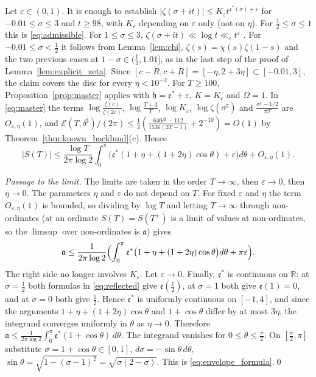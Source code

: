 \documentclass[11pt,a4paper]{article}
\makeatletter
\numberwithin{equation}{section}
\DeclareRobustCommand{\CGref}[1]{\ref{#1}}
\DeclareRobustCommand{\CGeqref}[1]{\eqref{#1}}
\DeclareRobustCommand{\CGcite}[2][]{\if\relax\detokenize{#1}\relax\cite{#2}\else\cite[#1]{#2}\fi}
\let\CG@origref\ref
\let\CG@origeqref\eqref
\newcommand{\CG@gettip}[1]{\@ifundefined{CGTip@#1}{#1}{\csname CGTip@#1\endcsname}}
\newcommand{\CG@getbib}[1]{\@ifundefined{CGBib@#1}{#1}{\csname CGBib@#1\endcsname}}
\DeclareRobustCommand{\CGref}[1]{\pdftooltip{\CG@origref{#1}}{\CG@gettip{#1}}}
\DeclareRobustCommand{\CGeqref}[1]{\pdftooltip{\CG@origeqref{#1}}{\CG@gettip{#1}}}
\DeclareRobustCommand{\CGcite}[2][]{\pdftooltip{\if\relax\detokenize{#1}\relax\cite{#2}\else\cite[#1]{#2}\fi}{\CG@getbib{#2}}}
\theoremstyle{definition}
\theoremstyle{remark}
\newcommand{\R}{\mathbb R}
\makeatother
\begin{document}
Let $\varepsilon\in(0,1)$. It is enough to establish $|\zeta(\sigma+it)|\le K_\varepsilon t^{\mathfrak e^*(\sigma)+\varepsilon}$ for $-0.01\le\sigma\le3$ and $t\ge98$, with $K_\varepsilon$ depending on $\varepsilon$ only (not on $\eta$). For $\frac12\le\sigma\le1$ this is \CGeqref{eq:admissible}. For $1\le\sigma\le3$, $\zeta(\sigma+it)\ll\log t\ll_\varepsilon t^\varepsilon$ \CGcite[Thm.~3.5]{Titchmarsh1986}. For $-0.01\le\sigma<\frac12$ it follows from Lemma~\CGref{lem:chi}, $\zeta(s)=\chi(s)\zeta(1-s)$ and the two previous cases at $1-\sigma\in(\frac12,1.01]$, as in the last step of the proof of Lemma~\CGref{lem:explicit_zeta}. Since $[c-R,c+R]=[-\eta,2+3\eta]\subset[-0.01,3]$, the claim covers the disc for every $\eta<10^{-2}$. For $T\ge100$, Proposition~\CGref{prop:master} applies with $\mathfrak h=\mathfrak e^*+\varepsilon$, $K=K_\varepsilon$ and $\Omega=1$. In \CGeqref{eq:master} the terms $\log\frac{\zeta(c)}{\zeta(2c)}$, $\log\frac{T+3}T$, $\log K_\varepsilon$, $\log\zeta(\sigma^\sharp)$ and $\frac{\sigma^\sharp-1/2}{\pi T}$ are $O_{\varepsilon,\eta}(1)$, and $\mathcal E(T,\delta^\sharp)/(2\pi)\le\frac12(\frac{640\delta^\sharp-112}{1536(3T-1)}+2^{-10})=O(1)$ by Theorem~\CGref{thm:known_backlund}(c). Hence
\[
|S(T)|\le\frac{\log T}{2\pi\log2}\int_0^\pi\bigl(\mathfrak e^*(1+\eta+(1+2\eta)\cos\theta)+\varepsilon\bigr)d\theta+O_{\varepsilon,\eta}(1).
\]

\emph{Passage to the limit.} The limits are taken in the order $T\to\infty$, then $\varepsilon\to0$, then $\eta\to0$. The parameters $\eta$ and $\varepsilon$ do not depend on $T$. For fixed $\varepsilon$ and $\eta$ the term $O_{\varepsilon,\eta}(1)$ is bounded, so dividing by $\log T$ and letting $T\to\infty$ through non-ordinates (at an ordinate $S(T)=S(T^+)$ is a limit of values at non-ordinates, so the $\limsup$ over non-ordinates is $\mathfrak a$) gives
\[
\mathfrak a\le\frac1{2\pi\log2}\Bigl(\int_0^\pi\mathfrak e^*\bigl(1+\eta+(1+2\eta)\cos\theta\bigr)d\theta+\pi\varepsilon\Bigr).
\]
The right side no longer involves $K_\varepsilon$. Let $\varepsilon\to0$. Finally, $\mathfrak e^*$ is continuous on $\R$: at $\sigma=\frac12$ both formulas in \CGeqref{eq:reflected} give $\mathfrak e(\frac12)$, at $\sigma=1$ both give $\mathfrak e(1)=0$, and at $\sigma=0$ both give $\frac12$. Hence $\mathfrak e^*$ is uniformly continuous on $[-1,4]$, and since the arguments $1+\eta+(1+2\eta)\cos\theta$ and $1+\cos\theta$ differ by at most $3\eta$, the integrand converges uniformly in $\theta$ as $\eta\to0$. Therefore $\mathfrak a\le\frac1{2\pi\log2}\int_0^\pi\mathfrak e^*(1+\cos\theta)\,d\theta$. The integrand vanishes for $0\le\theta\le\frac\pi2$. On $[\frac\pi2,\pi]$ substitute $\sigma=1+\cos\theta\in[0,1]$, $d\sigma=-\sin\theta\,d\theta$, $\sin\theta=\sqrt{1-(\sigma-1)^2}=\sqrt{\sigma(2-\sigma)}$. This is \CGeqref{eq:envelope_formula}.\qed
\end{document}
